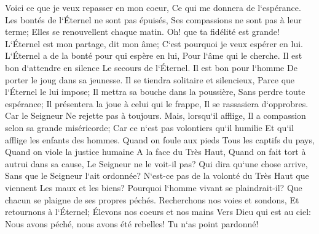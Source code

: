 \verse Voici ce que je veux repasser en mon coeur, Ce qui me donnera de l`espérance. 
\verse Les bontés de l`Éternel ne sont pas épuisés, Ses compassions ne sont pas à leur terme; 
\verse Elles se renouvellent chaque matin. Oh! que ta fidélité est grande! 
\verse L`Éternel est mon partage, dit mon âme; C`est pourquoi je veux espérer en lui. 
\verse L`Éternel a de la bonté pour qui espère en lui, Pour l`âme qui le cherche. 
\verse Il est bon d`attendre en silence Le secours de l`Éternel. 
\verse Il est bon pour l`homme De porter le joug dans sa jeunesse. 
\verse Il se tiendra solitaire et silencieux, Parce que l`Éternel le lui impose; 
\verse Il mettra sa bouche dans la poussière, Sans perdre toute espérance; 
\verse Il présentera la joue à celui qui le frappe, Il se rassasiera d`opprobres. 
\verse Car le Seigneur Ne rejette pas à toujours. 
\verse Mais, lorsqu`il afflige, Il a compassion selon sa grande miséricorde; 
\verse Car ce n`est pas volontiers qu`il humilie Et qu`il afflige les enfants des hommes. 
\verse Quand on foule aux pieds Tous les captifs du pays, 
\verse Quand on viole la justice humaine A la face du Très Haut, 
\verse Quand on fait tort à autrui dans sa cause, Le Seigneur ne le voit-il pas? 
\verse Qui dira qu`une chose arrive, Sans que le Seigneur l`ait ordonnée? 
\verse N`est-ce pas de la volonté du Très Haut que viennent Les maux et les biens? 
\verse Pourquoi l`homme vivant se plaindrait-il? Que chacun se plaigne de ses propres péchés. 
\verse Recherchons nos voies et sondons, Et retournons à l`Éternel; 
\verse Élevons nos coeurs et nos mains Vers Dieu qui est au ciel: 
\verse Nous avons péché, nous avons été rebelles! Tu n`as point pardonné! 
